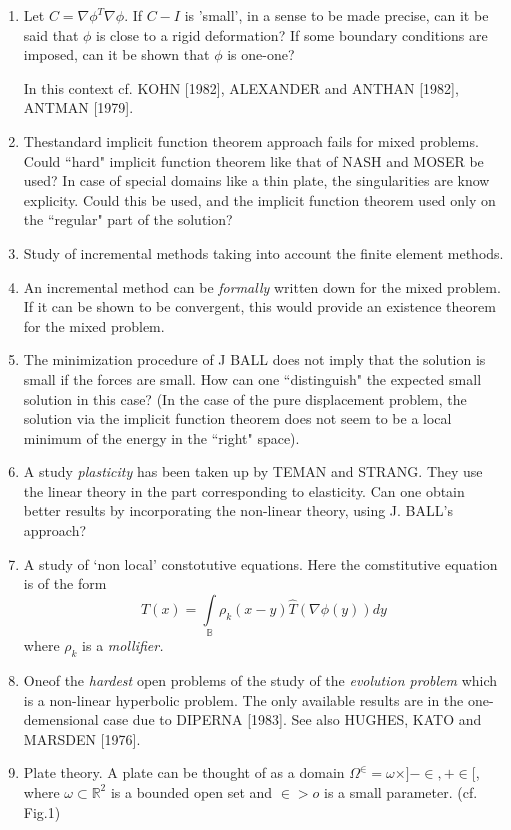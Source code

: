 \begin{enumerate}[1.]
\item Let $C=\nabla \phi^T \nabla \phi$. If $C-I$ is
  'small', in a sense to be made precise, can it be said that $\phi$
  is close to a rigid deformation? If some boundary conditions are
  imposed, can it be shown that $\phi$ is one-one? 

In this context cf. KOHN [1982], ALEXANDER and ANTHAN [1982],
ANTMAN [1979].  

\item The\pageoriginale standard implicit function theorem approach
  fails for mixed\break 
  problems. Could ``hard" implicit function theorem like that of NASH
  and MOSER be used? In case of special domains like a thin plate,
  the singularities are know explicity. Could this be used, and the
  implicit function theorem used only on the ``regular" part of the
  solution? 
\item Study of incremental methods taking into account the finite
  element methods.  
\item An incremental method can be \textit{formally} written down for
  the mixed problem. If it can be shown to be convergent, this would
  provide an existence theorem for the mixed problem.  
\item The minimization procedure of J BALL does not imply that the
  solution is small if the forces are small. How can one
  ``distinguish" the expected small solution in this case? (In the
  case of the pure displacement problem, the solution via the implicit
  function theorem does not seem to be a local minimum of the energy
  in the ``right" space).  
\item A study \textit{plasticity} has been taken up by TEMAN and
  STRANG\-[1980a, 1980b]. They use the linear theory in the part
  corresponding to elasticity. Can one obtain better results by
  incorporating the non-linear theory, using J. BALL's approach? 
\item A study of `non local' constotutive equations. Here the
  comstitutive equation is of the form 
$$
T(x)= \int \limits_{\mathbb{B}} \rho_k (x-y) \hat{T} (\nabla \phi (y))dy
$$
where $\rho_k$ is a \textit{mollifier.}

\item One\pageoriginale of the \textit{hardest} open problems of the
study of the 
  \textit{evolution problem} which is a non-linear hyperbolic
  problem. The only available results are in the one-demensional case
  due to DIPERNA [1983]. See also HUGHES, KATO and MARSDEN [1976].  
\item Plate theory. A plate can be thought of as a domain $\Omega^\in
  = \omega \times ]-\in,+ \in [$, where $\omega \subset \mathbb{R}^2$
    is a bounded open set and $\in >o$ is a small
    parameter. (cf. Fig.1) 
    

\end{enumerate}
